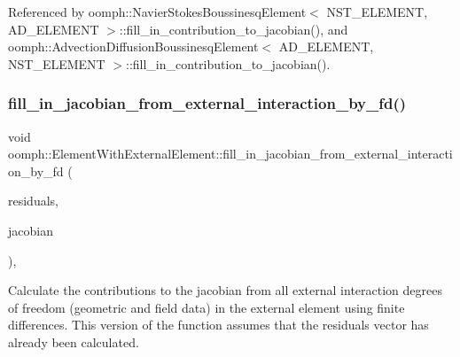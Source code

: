 Referenced by oomph\+::\+Navier\+Stokes\+Boussinesq\+Element$<$ N\+S\+T\+\_\+\+E\+L\+E\+M\+E\+N\+T, A\+D\+\_\+\+E\+L\+E\+M\+E\+N\+T $>$\+::fill\+\_\+in\+\_\+contribution\+\_\+to\+\_\+jacobian(), and oomph\+::\+Advection\+Diffusion\+Boussinesq\+Element$<$ A\+D\+\_\+\+E\+L\+E\+M\+E\+N\+T, N\+S\+T\+\_\+\+E\+L\+E\+M\+E\+N\+T $>$\+::fill\+\_\+in\+\_\+contribution\+\_\+to\+\_\+jacobian().

\mbox{\label{classoomph_1_1ElementWithExternalElement_a80731cecc55aee156fb92aa72a77e882}} 
\subsubsection{\texorpdfstring{fill\+\_\+in\+\_\+jacobian\+\_\+from\+\_\+external\+\_\+interaction\+\_\+by\+\_\+fd()}{fill\_in\_jacobian\_from\_external\_interaction\_by\_fd()}\hspace{0.1cm}{\footnotesize\ttfamily [1/2]}}
{\footnotesize\ttfamily void oomph\+::\+Element\+With\+External\+Element\+::fill\+\_\+in\+\_\+jacobian\+\_\+from\+\_\+external\+\_\+interaction\+\_\+by\+\_\+fd (\begin{DoxyParamCaption}\item[{\hyperlink{classoomph_1_1Vector}{Vector}$<$ double $>$ \&}]{residuals,  }\item[{\hyperlink{classoomph_1_1DenseMatrix}{Dense\+Matrix}$<$ double $>$ \&}]{jacobian }\end{DoxyParamCaption})\hspace{0.3cm}{\ttfamily [inline]}, {\ttfamily [protected]}}



Calculate the contributions to the jacobian from all external interaction degrees of freedom (geometric and field data) in the external element using finite differences. This version of the function assumes that the residuals vector has already been calculated. 



